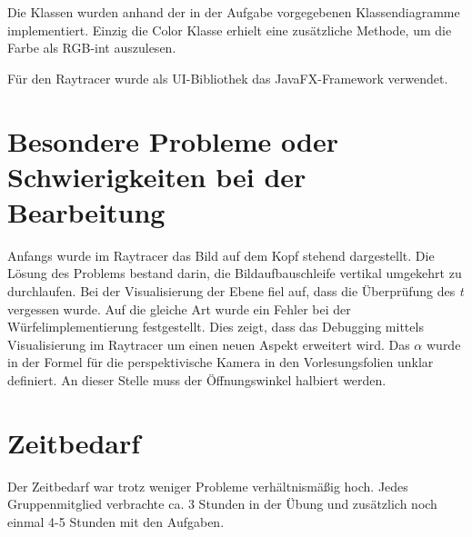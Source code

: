 \documentclass[a4paper,parskip=half,11pt]{scrartcl}
\begin{document}
Die Klassen wurden anhand der in der Aufgabe vorgegebenen Klassendiagramme implementiert.
Einzig die Color Klasse erhielt eine zusätzliche Methode, um die Farbe als RGB-int auszulesen.

Für den Raytracer wurde als UI-Bibliothek das JavaFX-Framework verwendet. 


\section*{Besondere Probleme oder Schwierigkeiten bei der Bearbeitung}

Anfangs wurde im Raytracer das Bild auf dem Kopf stehend dargestellt. 
Die Lösung des Problems bestand darin, die Bildaufbauschleife vertikal umgekehrt zu durchlaufen.
Bei der Visualisierung der Ebene fiel auf, dass die Überprüfung des \emph{t} vergessen wurde. Auf die gleiche Art wurde ein Fehler bei der Würfelimplementierung festgestellt.
Dies zeigt, dass das Debugging mittels Visualisierung im Raytracer um einen neuen Aspekt erweitert wird.
Das $\alpha$ wurde in der Formel für die perspektivische Kamera in den Vorlesungsfolien unklar definiert. An dieser Stelle muss der Öffnungswinkel halbiert werden.


\section*{Zeitbedarf}

Der Zeitbedarf war trotz weniger Probleme verhältnismäßig hoch. Jedes Gruppenmitglied verbrachte ca. 3 Stunden in der Übung und zusätzlich noch einmal 4-5 Stunden mit den Aufgaben.
\end{document}
